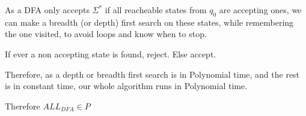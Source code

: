 
As a DFA only accepts $\Sigma^*$ if all reacheable states from $q_0$ are accepting ones, we can make a breadth (or depth) first search on these states, while remembering the one visited, to avoid loops and know when to stop.

If ever a non accepting state is found, reject. Else accept.

Therefore, as a depth or breadth first search is in Polynomial time, and the rest is in constant time, our whole algorithm runs in Polynomial time.

Therefore $ALL_{DFA} \in P$